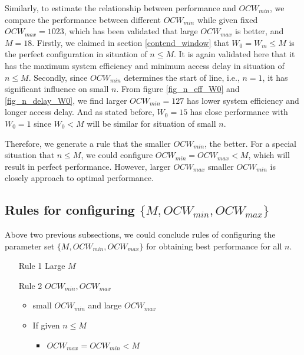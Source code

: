 Similarly, to estimate the relationship between performance and $OCW_{min}$, we compare the performance between different $OCW_{min}$ while given fixed $OCW_{max}=1023$, which has been validated that large $OCW_{max}$ is better, and $M=18$. 
Firstly, we claimed in section \ref{contend_window} that $W_0=W_m\leq M$ is the perfect configuration in situation of $n\leq M$. It is again validated here that it has the maximum system efficiency and minimum access delay in situation of $n\leq M$. 
Secondly, since $OCW_{min}$ determines the start of line, i.e., $n=1$, it has significant influence on small $n$.
From figure \ref{fig_n_eff_W0} and \ref{fig_n_delay_W0}, we find larger $OCW_{min}=127$ has lower system efficiency and longer access delay. And as stated before, $W_0=15$ has close performance with $W_0=1$ since $W_0<M$ will be similar for situation of small $n$.

Therefore, we generate a rule that the smaller $OCW_{min}$, the better.
For a special situation that $n\leq M$, we could configure $OCW_{min}=OCW_{max}<M$, which will result in perfect performance. 
However, larger $OCW_{max}$ smaller $OCW_{min}$ is closely approach to optimal performance.

\subsection{Rules for configuring $\lbrace M, OCW_{min}, OCW_{max} \rbrace$}
Above two previous subsections, we could conclude rules of configuring the parameter set $\lbrace M, OCW_{min}, OCW_{max} \rbrace$ for obtaining best performance for all $n$. 
\begin{itemize}
\item[Rule 1] Large $M$
\item[Rule 2] $OCW_{min}, OCW_{max}$
	\begin{itemize}
	\item small $OCW_{min}$ and large $OCW_{max}$
	\item If given $n\leq M$
	\begin{itemize}
		\item $OCW_{max}=OCW_{min}<M$
	\end{itemize}
	\end{itemize}
\end{itemize}


